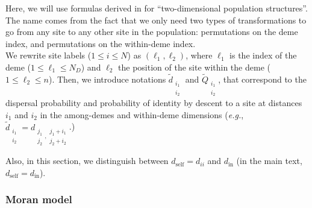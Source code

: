 \documentclass[11pt, letterpaper]{article}
\newcommand{\eg}{\textit{e.g.}}
\newcommand{\self}{\textrm{self}}
\newcommand{\inn}{\textrm{in}}
\newcommand{\din}{d_{\inn}}
\newcommand{\dself}{d_{\self}}
\newcommand{\ndemes}{N_D}
\begin{document}
Here, we will use formulas derived in \citet{Debarre2017} for ``two-dimensional population structures''. The name comes from the fact that we only need two types of transformations to go from any site to any other site in the population: permutations on the deme index, and permutations on the within-deme index.  \\
%
We rewrite site labels ($1\leq i \leq N$) as $(\ell_1, \ell_2)$, where $\ell_1$ is the index of the deme ($1\leq \ell_1 \leq \ndemes$) and $\ell_2$ the position of the site within the deme ($1\leq \ell_2 \leq n$). Then, we introduce notations $\tilde{d}_{\substack{i_1\\i_2}}$ and $\tilde{Q}_{\substack{i_1\\i_2}}$, that correspond to the dispersal probability and probability of identity by descent to a site at distances $i_1$ and $i_2$ in the among-demes and within-deme dimensions (\eg, $\tilde{d}_{\substack{i_1\\i_2}} = d_{\substack{j_1\\j_2}, \substack{j_1+i_1\\j_2+i_2}}$.) 

Also, in this section, we distinguish between $\dself = d_{ii}$ and $\din$ (in the main text, $\dself = \din$). 

\subsubsection{Moran model}
\end{document}
